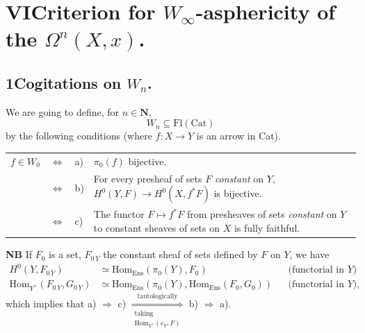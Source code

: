 \documentclass[11pt]{article}
\newcommand{\printedpage}[1]{\marginpar{\footnotesize p.~#1}}
\newcommand{\msp}[1]{\marginpar{\footnotesize [#1]}}
\newcommand{\HomEns}{\mathrm{Hom}_{\mathrm{Ens}}}
\begin{document}
\printedpage{115}

\msp{page 171}

\section*{VI\quad Criterion for $W_\infty$-asphericity of the $\Omega^n(X,x)$.}

\subsection*{1\quad Cogitations on $W_n$.}

We are going to define, for $n \in \mathbf{N}$,
\[
W_n \subseteq \mathrm{Fl}(\mathrm{Cat})
\]
by the following conditions (where $f : X \longrightarrow Y$ is an arrow in Cat).

\noindent\begin{tabular}{@{}l c l >{\RaggedRight\arraybackslash}p{}@{}}
$f \in W_0$ & $\Longleftrightarrow$ & a) & $\pi_0(f)$ bijective.\\
 & $\Longleftrightarrow$ & b) & For every presheaf of sets $F$ \textit{constant} on $Y$, $H^0(Y,F) \longrightarrow H^0(X,f^*F)$ is bijective.\\
 & $\Longleftrightarrow$ & c) & The functor $F \longmapsto f^*F$ from presheaves of sets \textit{constant} on $Y$ to constant sheaves of sets on $X$ is fully faithful.
\end{tabular}



\textbf{NB} If $F_0$ is a set, $F_{0\,Y}$ the constant sheaf of sets defined by $F$ on $Y$, we have
\[
\begin{aligned}
H^0(Y,F_{0\,Y}) &\simeq \HomEns(\pi_0(Y),F_0) && \text{(functorial in $Y$)}\\
\mathrm{Hom}_{Y^\wedge}(F_{0\,Y},G_{0\,Y}) &\simeq \HomEns(\pi_0(Y),\HomEns(F_0,G_0)) && \text{(functorial in $Y$),}
\end{aligned}
\]
which implies that a) $\Longrightarrow$ c) $\underset{\substack{\text{taking}\\ \mathrm{Hom}_{Y^\wedge}(e_Y,F)}}{\overset{\text{tautologically}}{\Longrightarrow}}$ b) $\Longrightarrow$ a).
\end{document}

